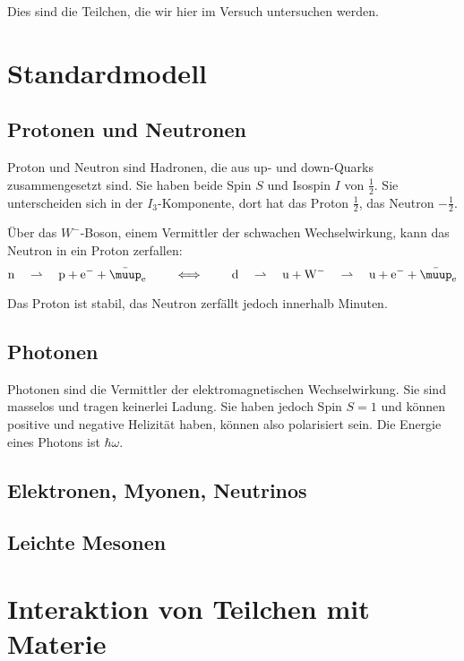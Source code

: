 \documentclass[11pt, ngerman, fleqn, DIV=15, headinclude, BCOR=2cm]{scrreprt}
\begin{document}
Dies sind die Teilchen, die wir hier im Versuch untersuchen werden.

\section{Standardmodell}

\subsection{Protonen und Neutronen}

Proton und Neutron sind Hadronen, die aus up- und down-Quarks zusammengesetzt
sind. Sie haben beide Spin $S$ und Isospin $I$ von $\frac12$. Sie unterscheiden
sich in der $I_3$-Komponente, dort hat das Proton $\frac12$, das Neutron
$-\frac12$.

Über das $W^-$-Boson, einem Vermittler der schwachen Wechselwirkung, kann das
Neutron in ein Proton zerfallen:
\[
    \mathrm n \quad\rightharpoonup\quad \mathrm p + \mathrm e^- + \bar
    \muup_\mathrm e
    \qquad\iff\qquad
    \mathrm d
    \quad\rightharpoonup\quad
    \mathrm u + \mathrm W^-
    \quad\rightharpoonup\quad
    \mathrm u
    + \mathrm e^- + \bar \muup_\mathrm e
\]

Das Proton ist stabil, das Neutron zerfällt jedoch innerhalb Minuten.

\subsection{Photonen}

Photonen sind die Vermittler der elektromagnetischen Wechselwirkung. Sie sind
masselos und tragen keinerlei Ladung. Sie haben jedoch Spin $S = 1$ und können
positive und negative Helizität haben, können also polarisiert sein. Die
Energie eines Photons ist $\hbar \omega$.

\subsection{Elektronen, Myonen, Neutrinos}

\subsection{Leichte Mesonen}

\section{Interaktion von Teilchen mit Materie}
\end{document}
